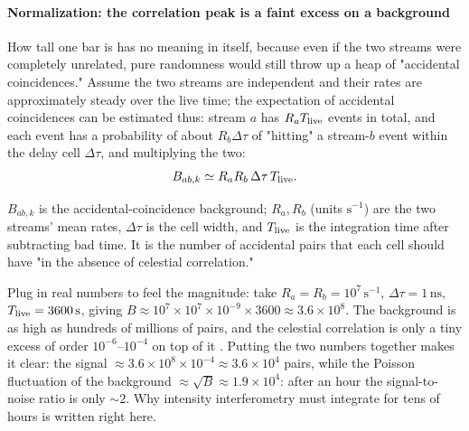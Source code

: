 \paragraph{Normalization: the correlation peak is a faint excess on a background}

How tall one bar is has no meaning in itself, because even if the two streams were completely unrelated, pure randomness would still throw up a heap of "accidental coincidences." Assume the two streams are independent and their rates are approximately steady over the live time; the expectation of accidental coincidences can be estimated thus: stream $a$ has $R_aT_{\rm live}$ events in total, and each event has a probability of about $R_b\Delta\tau$ of "hitting" a stream-$b$ event within the delay cell $\Delta\tau$, and multiplying the two:
\begin{equation}
  B_{ab,k}\simeq R_aR_b\,\Delta\tau\,T_{\rm live} .
  \label{eq:e14-accidental}
\end{equation}
\begin{formulaexplain}
$B_{ab,k}$ is the accidental-coincidence background; $R_a,R_b$ (units $\mathrm{s^{-1}}$) are the two streams' mean rates, $\Delta\tau$ is the cell width, and $T_{\rm live}$ is the integration time after subtracting bad time. It is the number of accidental pairs that each cell should have "in the absence of celestial correlation."
\end{formulaexplain}
Plug in real numbers to feel the magnitude: take $R_a=R_b=10^{7}\,\mathrm{s^{-1}}$, $\Delta\tau=1\,\mathrm{ns}$, $T_{\rm live}=3600\,\mathrm{s}$, giving $B\approx10^{7}\times10^{7}\times10^{-9}\times3600\approx3.6\times10^{8}$. The background is as high as hundreds of millions of pairs, and the celestial correlation is only a tiny excess of order $10^{-6}$--$10^{-4}$ on top of it \citep{1974iiia.book.....H,2020NatAs...4.1164A,2024MNRAS.529.4387A}. Putting the two numbers together makes it clear: the signal $\approx3.6\times10^{8}\times10^{-4}\approx3.6\times10^{4}$ pairs, while the Poisson fluctuation of the background $\approx\sqrt{B}\approx1.9\times10^{4}$: after an hour the signal-to-noise ratio is only $\sim2$. Why intensity interferometry must integrate for tens of hours is written right here.

